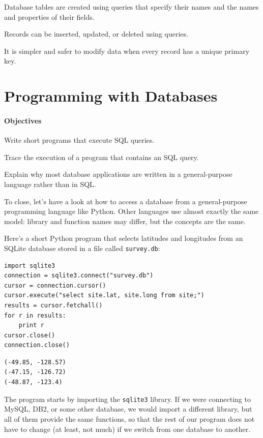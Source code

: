 \documentclass{book}
\begin{document}
\begin{swcitemize}
\item
  Database tables are created using queries that specify their names and
  the names and properties of their fields.
\item
  Records can be inserted, updated, or deleted using queries.
\item
  It is simpler and safer to modify data when every record has a unique
  primary key.
\end{swcitemize}

\section{Programming with Databases}

\mbox{}\paragraph{Objectives}

\begin{swcitemize}
\item
  Write short programs that execute SQL queries.
\item
  Trace the execution of a program that contains an SQL query.
\item
  Explain why most database applications are written in a
  general-purpose language rather than in SQL.
\end{swcitemize}

To close, let's have a look at how to access a database from a
general-purpose programming language like Python. Other languages use
almost exactly the same model: library and function names may differ,
but the concepts are the same.

Here's a short Python program that selects latitudes and longitudes from
an SQLite database stored in a file called \texttt{survey.db}:

\begin{verbatim}
import sqlite3
connection = sqlite3.connect("survey.db")
cursor = connection.cursor()
cursor.execute("select site.lat, site.long from site;")
results = cursor.fetchall()
for r in results:
    print r
cursor.close()
connection.close()
\end{verbatim}

\begin{verbatim}
(-49.85, -128.57)
(-47.15, -126.72)
(-48.87, -123.4)
\end{verbatim}

The program starts by importing the \texttt{sqlite3} library. If we were
connecting to MySQL, DB2, or some other database, we would import a
different library, but all of them provide the same functions, so that
the rest of our program does not have to change (at least, not much) if
we switch from one database to another.
\end{document}
